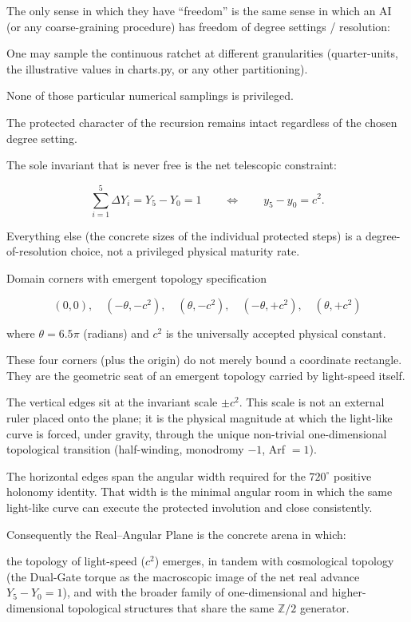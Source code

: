 The only sense in which they have “freedom” is the same sense in which an AI (or any coarse-graining procedure) has freedom of degree settings / resolution:

One may sample the continuous ratchet at different granularities (quarter-units, the illustrative values in charts.py, or any other partitioning). 

None of those particular numerical samplings is privileged. 

The protected character of the recursion remains intact regardless of the chosen degree setting.

The sole invariant that is never free is the net telescopic constraint:

\[ \sum_{i=1}^{5}\Delta Y_i = Y_5 - Y_0 = 1 \qquad\Longleftrightarrow\qquad y_5 - y_0 = c^2. \]

Everything else (the concrete sizes of the individual protected steps) is a degree-of-resolution choice, not a privileged physical maturity rate.


Domain corners with emergent topology specification

\[
(0,0),\quad
(-\theta,-c^2),\quad
(\theta,-c^2),\quad
(-\theta,+c^2),\quad
(\theta,+c^2)
\]

where \(\theta=6.5\pi\) (radians) and \(c^2\) is the universally accepted physical constant.

These four corners (plus the origin) do not merely bound a coordinate rectangle.  
They are the geometric seat of an emergent topology carried by light-speed itself.

The vertical edges sit at the invariant scale \(\pm c^2\).  
  This scale is not an external ruler placed onto the plane; it is the physical magnitude at which the light-like curve is forced, under gravity, through the unique non-trivial one-dimensional topological transition (half-winding, monodromy \(-1\), Arf \(=1\)).

The horizontal edges span the angular width required for the \(720^\circ\) positive holonomy identity.  
  That width is the minimal angular room in which the same light-like curve can execute the protected involution and close consistently.

Consequently the Real–Angular Plane is the concrete arena in which:

the topology of light-speed (\(c^2\)) emerges,  
in tandem with cosmological topology (the Dual-Gate torque as the macroscopic image of the net real advance \(Y_5-Y_0=1\)),  
and with the broader family of one-dimensional and higher-dimensional topological structures that share the same \(\mathbb{Z}/2\) generator.

